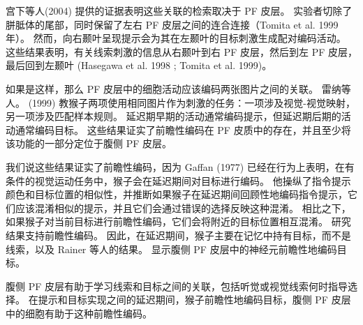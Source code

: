 \par
宫下等人(2004) 提供的证据表明这些关联的检索取决于 PF 皮层。
实验者切除了胼胝体的尾部，同时保留了左右 PF 皮层之间的连合连接（Tomita et al. 1999 年）。
然而，向右颞叶呈现提示会为其在左颞叶的目标刺激生成配对编码活动。 
这些结果表明，有关线索刺激的信息从右颞叶到右 PF 皮层，然后到左 PF 皮层，最后回到左颞叶 (Hasegawa et al. 1998 ; Tomita et al. 1999)。
\par
如果是这样，那么 PF 皮层中的细胞活动应该编码两张图片之间的关联。 
雷纳等人。 (1999) 教猴子两项使用相同图片作为刺激的任务：一项涉及视觉-视觉映射，另一项涉及匹配样本规则。 
延迟期早期的活动通常编码提示，但延迟期后期的活动通常编码目标。 
这些结果证实了前瞻性编码在 PF 皮质中的存在，并且至少将该功能的一部分定位于腹侧 PF 皮层。
\par
我们说这些结果证实了前瞻性编码，因为 Gaffan (1977) 已经在行为上表明，在有条件的视觉运动任务中，猴子会在延迟期间对目标进行编码。 
他操纵了指令提示颜色和目标位置的相似性，并推断如果猴子在延迟期间回顾性地编码指令提示，它们应该混淆相似的提示，并且它们会通过错误的选择反映这种混淆。 
相比之下，如果猴子对当前目标进行前瞻性编码，它们会将附近的目标位置相互混淆。
研究结果支持前瞻性编码。 
因此，在延迟期间，猴子主要在记忆中持有目标，而不是线索，以及 Rainer 等人的结果。 显示腹侧 PF 皮层中的神经元前瞻性地编码目标。

\par
腹侧 PF 皮层有助于学习线索和目标之间的关联，包括听觉或视觉线索何时指导选择。
在提示和目标实现之间的延迟期间，猴子前瞻性地编码目标，腹侧 PF 皮层中的细胞有助于这种前瞻性编码。


